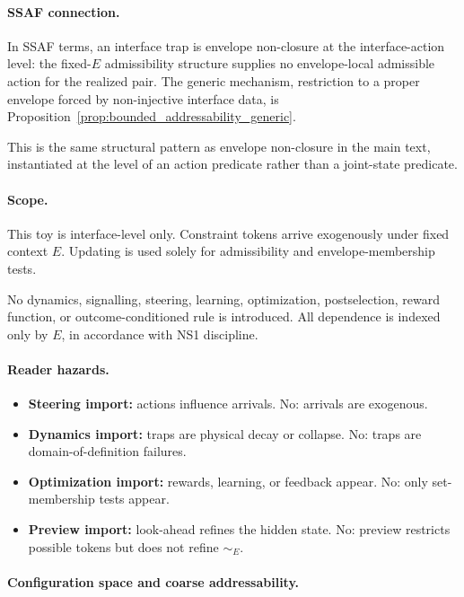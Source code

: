\documentclass[aps,prx,onecolumn,11pt]{revtex4-2}
\theoremstyle{plain}
\theoremstyle{definition}
\theoremstyle{remark}
\begin{document}
\paragraph{SSAF connection.}

In SSAF terms, an interface trap is envelope non-closure at the
interface-action level: the fixed-\(E\) admissibility structure supplies
no envelope-local admissible action for the realized pair. The generic
mechanism, restriction to a proper envelope forced by non-injective
interface data, is Proposition~\ref{prop:bounded_addressability_generic}.

This is the same structural pattern as envelope non-closure in the main
text, instantiated at the level of an action predicate rather than a
joint-state predicate.

\paragraph{Scope.}

This toy is interface-level only. Constraint tokens arrive exogenously
under fixed context \(E\). Updating is used solely for admissibility and
envelope-membership tests.

No dynamics, signalling, steering, learning, optimization,
postselection, reward function, or outcome-conditioned rule is
introduced. All dependence is indexed only by \(E\), in accordance with
NS1 discipline.

\paragraph{Reader hazards.}

\begin{itemize}
\item \textbf{Steering import:} actions influence arrivals. No:
arrivals are exogenous.
\item \textbf{Dynamics import:} traps are physical decay or collapse.
No: traps are domain-of-definition failures.
\item \textbf{Optimization import:} rewards, learning, or feedback
appear. No: only set-membership tests appear.
\item \textbf{Preview import:} look-ahead refines the hidden state. No:
preview restricts possible tokens but does not refine \(\sim_E\).
\end{itemize}

\paragraph{Configuration space and coarse addressability.}
\end{document}
